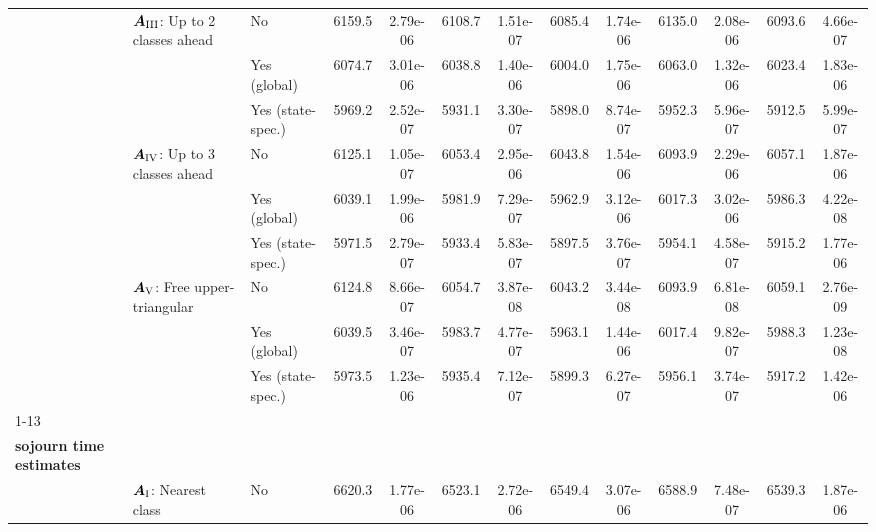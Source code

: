 \begin{threeparttable}
\begin{tabular}[t]{>{}lllcccccccccc}
\addlinespace[0.5em]

\hspace{1em} & $\bm{A}_{\RN{3}}$: Up to 2 classes ahead & No & 6159.5 & 2.79e-06 & 6108.7 & 1.51e-07 & 6085.4 & 1.74e-06 & 6135.0 & 2.08e-06 & 6093.6 & 4.66e-07\\

\hspace{1em} &  & Yes (global) & 6074.7 & 3.01e-06 & 6038.8 & 1.40e-06 & 6004.0 & 1.75e-06 & 6063.0 & 1.32e-06 & 6023.4 & 1.83e-06\\

\hspace{1em} &  & Yes (state-spec.) & 5969.2 & 2.52e-07 & 5931.1 & 3.30e-07 & 5898.0 & 8.74e-07 & 5952.3 & 5.96e-07 & 5912.5 & 5.99e-07\\

\addlinespace[0.5em]

\hspace{1em} & $\bm{A}_{\RN{4}}$: Up to 3 classes ahead & No & 6125.1 & 1.05e-07 & 6053.4 & 2.95e-06 & 6043.8 & 1.54e-06 & 6093.9 & 2.29e-06 & 6057.1 & 1.87e-06\\

\hspace{1em} &  & Yes (global) & 6039.1 & 1.99e-06 & 5981.9 & 7.29e-07 & 5962.9 & 3.12e-06 & 6017.3 & 3.02e-06 & 5986.3 & 4.22e-08\\

\hspace{1em} &  & Yes (state-spec.) & 5971.5 & 2.79e-07 & 5933.4 & 5.83e-07 & 5897.5 & 3.76e-07 & 5954.1 & 4.58e-07 & 5915.2 & 1.77e-06\\

\addlinespace[0.5em]

\hspace{1em} & $\bm{A}_{\RN{5}}$: Free upper-triangular & No & 6124.8 & 8.66e-07 & 6054.7 & 3.87e-08 & 6043.2 & 3.44e-08 & 6093.9 & 6.81e-08 & 6059.1 & 2.76e-09\\

\hspace{1em} &  & Yes (global) & 6039.5 & 3.46e-07 & 5983.7 & 4.77e-07 & 5963.1 & 1.44e-06 & 6017.4 & 9.82e-07 & 5988.3 & 1.23e-08\\

\hspace{1em} &  & Yes (state-spec.) & 5973.5 & 1.23e-06 & 5935.4 & 7.12e-07 & 5899.3 & 6.27e-07 & 5956.1 & 3.74e-07 & 5917.2 & 1.42e-06\\
\cmidrule{1-13}
\addlinespace[0.3em]
\multicolumn{13}{l}{\textbf{\textbf{\makecell[l]{\textbf{Model with modified}\\ \textbf{sojourn time estimates}}}}}\\
\hspace{1em} & $\bm{A}_{\RN{1}}$: Nearest class & No & 6620.3 & 1.77e-06 & 6523.1 & 2.72e-06 & 6549.4 & 3.07e-06 & 6588.9 & 7.48e-07 & 6539.3 & 1.87e-06\\


\end{tabular}
\end{threeparttable}
